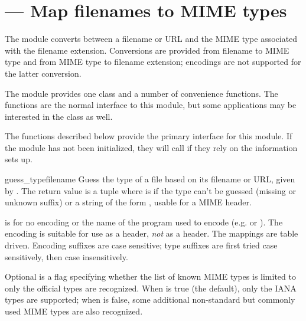 \section{ ---
         Map filenames to MIME types}




The  module converts between a filename or URL and
the MIME type associated with the filename extension.  Conversions are
provided from filename to MIME type and from MIME type to filename
extension; encodings are not supported for the latter conversion.

The module provides one class and a number of convenience functions.
The functions are the normal interface to this module, but some
applications may be interested in the class as well.

The functions described below provide the primary interface for this
module.  If the module has not been initialized, they will call
 if they rely on the information 
sets up.


\begin{funcdesc}{guess_type}{filename}
Guess the type of a file based on its filename or URL, given by
.  The return value is a tuple  where  is  if the type can't be
guessed (missing or unknown suffix) or a string of the form
, usable for a MIME
 header.

 is  for no encoding or the name of the
program used to encode (e.g.  or ).
The encoding is suitable for use as a 
header, \emph{not} as a  header.
The mappings are table driven.  Encoding suffixes are case sensitive;
type suffixes are first tried case sensitively, then case
insensitively.

Optional  is a flag specifying whether the list of known
MIME types is limited to only the official types 
are recognized.  When  is true (the default), only the
IANA types are supported; when  is false, some additional
non-standard but commonly used MIME types are also recognized.
\end{funcdesc}

